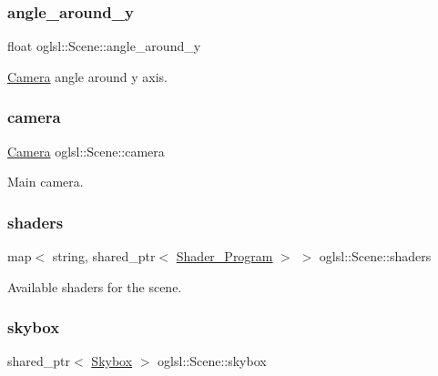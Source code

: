 \subsubsection{\texorpdfstring{angle\+\_\+around\+\_\+y}{angle\_around\_y}}
{\footnotesize\ttfamily float oglsl\+::\+Scene\+::angle\+\_\+around\+\_\+y\hspace{0.3cm}{\ttfamily [protected]}}



\mbox{\hyperlink{classoglsl_1_1_camera}{Camera}} angle around y axis. 

\mbox{\label{classoglsl_1_1_scene_a272ee5697b5bb4bfb725cb07b944dec4}} 
\subsubsection{\texorpdfstring{camera}{camera}}
{\footnotesize\ttfamily \mbox{\hyperlink{classoglsl_1_1_camera}{Camera}} oglsl\+::\+Scene\+::camera\hspace{0.3cm}{\ttfamily [protected]}}



Main camera. 

\mbox{\label{classoglsl_1_1_scene_ac60cfa73f999218a5c801308d29d33eb}} 
\subsubsection{\texorpdfstring{shaders}{shaders}}
{\footnotesize\ttfamily map$<$ string, shared\+\_\+ptr$<$ \mbox{\hyperlink{classoglsl_1_1_shader___program}{Shader\+\_\+\+Program}} $>$ $>$ oglsl\+::\+Scene\+::shaders\hspace{0.3cm}{\ttfamily [protected]}}



Available shaders for the scene. 

\mbox{\label{classoglsl_1_1_scene_af01c494a85900703fc19e5bb7c757ebc}} 
\subsubsection{\texorpdfstring{skybox}{skybox}}
{\footnotesize\ttfamily shared\+\_\+ptr$<$ \mbox{\hyperlink{classoglsl_1_1_skybox}{Skybox}} $>$ oglsl\+::\+Scene\+::skybox\hspace{0.3cm}{\ttfamily [protected]}}



